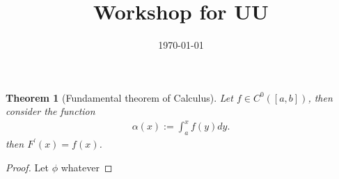 \documentclass[reqno]{amsart}
\title{Workshop for UU}
\author{}
\date{\today}
\newtheorem{theorem}{Theorem}
\newcommand{\<}{\langle}
\renewcommand{\>}{\rangle}
\renewcommand{\>}{\rangle}
\begin{document}
\maketitle

\begin{theorem}[Fundamental theorem of Calculus]
  Let $f \in C^0([a,b])$, then consider the function
%
\begin{align*}
  \alpha(x):=
  \int_{a}^x f(y)  dy.
\end{align*}
% 
then $F^\prime(x)=f(x)$. 
\end{theorem}
\begin{proof}
Let $\phi $ whatever
\end{proof}


%
%
\end{document}
